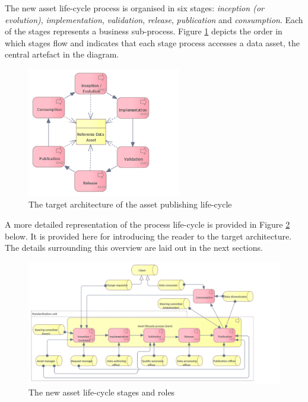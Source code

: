 	The new asset life-cycle process is organised in six stages: \textit{inception (or evolution)}, \textit{implementation}, \textit{validation}, \textit{release}, \textit{publication} and \textit{consumption}. Each of the stages represents a business sub-process. Figure \ref{fig:lifecycle-new-stages-overview} depicts the order in which stages flow and indicates that each stage process accesses a data asset, the central artefact in the diagram.
	
	\begin{figure}[h]
		\centering
		\includegraphics[width=0.6\textwidth]{docs/architecture/images/business/Lifecycle process only (new).png}
		\caption{The target architecture of the asset publishing life-cycle}
		\label{fig:lifecycle-new-stages-overview}
	\end{figure}
	
	A more detailed representation of the process life-cycle is provided in Figure \ref{fig:lifecycle-new-overview} below. It is provided here for introducing the reader to the target architecture. The details surrounding this overview are laid out in the next sections. 
	
	\begin{figure}[h]
		\centering
		\includegraphics[width=1.05\textwidth]{images/business/Lifecycle (new).png}
		\caption{The new asset life-cycle stages and roles}
		\label{fig:lifecycle-new-overview}
	\end{figure}
	
